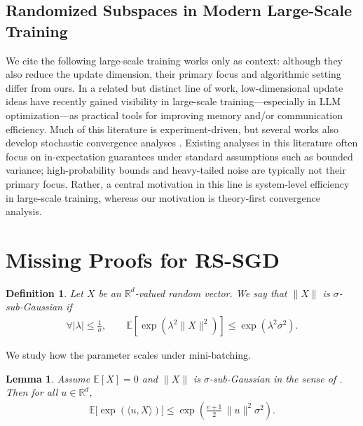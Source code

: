 \documentclass[10pt]{article}
\newtheorem{lemma}[lemma]{Lemma}
\newtheorem{definition}[definition]{Definition}
\begin{document}
\subsection{Randomized Subspaces in Modern Large-Scale Training}
\label{app:llm-subspace}
We cite the following large-scale training works only as context: although they also reduce the update dimension,
their primary focus and algorithmic setting differ from ours.
In a related but distinct line of work, low-dimensional update ideas have recently gained visibility in large-scale
training---especially in LLM optimization---as practical tools for improving memory and/or communication efficiency.
Much of this literature is experiment-driven, but several works also develop stochastic convergence analyses \citep{chen2025greedylore_v4,chen2025rso_llm_v1,wen2025sron,he2025subspace_llm}.
Existing analyses in this literature often focus on in-expectation guarantees under standard assumptions such as bounded variance;
high-probability bounds and heavy-tailed noise are typically not their primary focus. Rather, a central motivation in this line is
system-level efficiency in large-scale training, whereas our motivation is theory-first convergence analysis.


\section{Missing Proofs for RS-SGD}
\label{app:rsgd-hp}

\begin{definition}\label{app:def:norm-subg}
Let $X$ be an $\mathbb{R}^d$-valued random vector. We say that $\|X\|$ is $\sigma$-sub-Gaussian if
\begin{align*}
\forall |\lambda| \le \frac{1}{\sigma}, \qquad
\mathbb{E}\!\left[\exp\!\left(\lambda^2\|X\|^2\right)\right]
\le \exp\!\left(\lambda^2\sigma^2\right).
\end{align*}
\end{definition}

We study how the parameter scales under mini-batching.


\begin{lemma}\label{lem:norm-to-mgf}
Assume $\mathbb{E}[X]=0$ and $\|X\|$ is $\sigma$-sub-Gaussian in the sense of .
Then for all $u\in\mathbb{R}^d$,
\begin{align*}
\mathbb{E}\big[\exp(\langle u,X\rangle)\big]
\le \exp\!\left(\frac{e+1}{2}\,\|u\|^2\sigma^2\right).
\end{align*}
\end{lemma}
\end{document}
